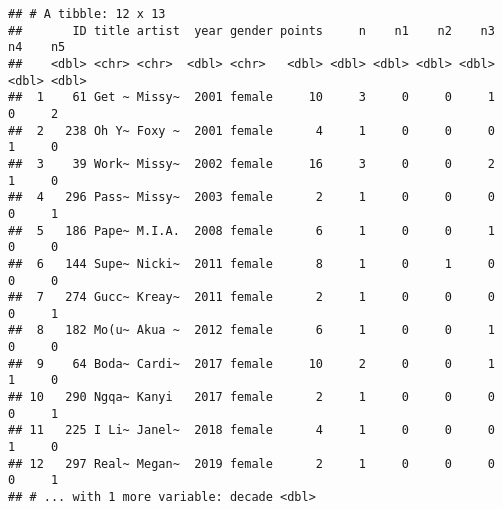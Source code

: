 \documentclass[
]{article}
\begin{document}
\begin{verbatim}
## # A tibble: 12 x 13
##       ID title artist  year gender points     n    n1    n2    n3    n4    n5
##    <dbl> <chr> <chr>  <dbl> <chr>   <dbl> <dbl> <dbl> <dbl> <dbl> <dbl> <dbl>
##  1    61 Get ~ Missy~  2001 female     10     3     0     0     1     0     2
##  2   238 Oh Y~ Foxy ~  2001 female      4     1     0     0     0     1     0
##  3    39 Work~ Missy~  2002 female     16     3     0     0     2     1     0
##  4   296 Pass~ Missy~  2003 female      2     1     0     0     0     0     1
##  5   186 Pape~ M.I.A.  2008 female      6     1     0     0     1     0     0
##  6   144 Supe~ Nicki~  2011 female      8     1     0     1     0     0     0
##  7   274 Gucc~ Kreay~  2011 female      2     1     0     0     0     0     1
##  8   182 Mo(u~ Akua ~  2012 female      6     1     0     0     1     0     0
##  9    64 Boda~ Cardi~  2017 female     10     2     0     0     1     1     0
## 10   290 Ngqa~ Kanyi   2017 female      2     1     0     0     0     0     1
## 11   225 I Li~ Janel~  2018 female      4     1     0     0     0     1     0
## 12   297 Real~ Megan~  2019 female      2     1     0     0     0     0     1
## # ... with 1 more variable: decade <dbl>
\end{verbatim}
\end{document}
